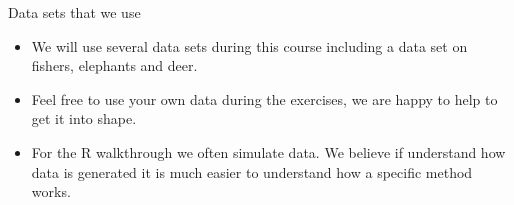 \documentclass[ignorenonframetext,,t]{beamer}
\providecommand{\tightlist}{%
\setlength{\itemsep}{0pt}\setlength{\parskip}{0pt}}
\providecommand{\tightlist}{%
\setlength{\itemsep}{0pt}\setlength{\parskip}{0pt}}
\renewcommand{\tightlist}{\setlength{\itemsep}{1.4ex}\setlength{\parskip}{0pt}}
\begin{document}
\begin{frame}{Data sets that we use}
\label{data-sets-that-we-use}
\begin{itemize}
\tightlist
\item
  We will use several data sets during this course including a data set
  on fishers, elephants and deer.
\item
  Feel free to use your own data during the exercises, we are happy to
  help to get it into shape.
\item
  For the R walkthrough we often simulate data. We believe if understand
  how data is generated it is much easier to understand how a specific
  method works.
\end{itemize}
\end{frame}
\end{document}

